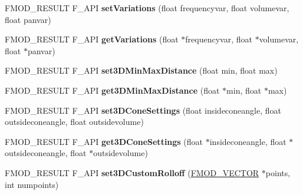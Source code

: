 \begin{DoxyCompactItemize}
\item 
\hypertarget{class_f_m_o_d_1_1_sound_adc2709acd1734f56b55c12dee01cda7b}{F\-M\-O\-D\-\_\-\-R\-E\-S\-U\-L\-T F\-\_\-\-A\-P\-I {\bfseries set\-Variations} (float frequencyvar, float volumevar, float panvar)}\label{class_f_m_o_d_1_1_sound_adc2709acd1734f56b55c12dee01cda7b}

\item 
\hypertarget{class_f_m_o_d_1_1_sound_a62af5aa6618aca4965b91dd01672b2b3}{F\-M\-O\-D\-\_\-\-R\-E\-S\-U\-L\-T F\-\_\-\-A\-P\-I {\bfseries get\-Variations} (float $\ast$frequencyvar, float $\ast$volumevar, float $\ast$panvar)}\label{class_f_m_o_d_1_1_sound_a62af5aa6618aca4965b91dd01672b2b3}

\item 
\hypertarget{class_f_m_o_d_1_1_sound_acc2bb0f37e41ccdacfc27ec28cd2cd26}{F\-M\-O\-D\-\_\-\-R\-E\-S\-U\-L\-T F\-\_\-\-A\-P\-I {\bfseries set3\-D\-Min\-Max\-Distance} (float min, float max)}\label{class_f_m_o_d_1_1_sound_acc2bb0f37e41ccdacfc27ec28cd2cd26}

\item 
\hypertarget{class_f_m_o_d_1_1_sound_aca77cc87d0375dcf9d26be19073dcc45}{F\-M\-O\-D\-\_\-\-R\-E\-S\-U\-L\-T F\-\_\-\-A\-P\-I {\bfseries get3\-D\-Min\-Max\-Distance} (float $\ast$min, float $\ast$max)}\label{class_f_m_o_d_1_1_sound_aca77cc87d0375dcf9d26be19073dcc45}

\item 
\hypertarget{class_f_m_o_d_1_1_sound_a9b239365e93cf9ec141b8239b2770e0a}{F\-M\-O\-D\-\_\-\-R\-E\-S\-U\-L\-T F\-\_\-\-A\-P\-I {\bfseries set3\-D\-Cone\-Settings} (float insideconeangle, float outsideconeangle, float outsidevolume)}\label{class_f_m_o_d_1_1_sound_a9b239365e93cf9ec141b8239b2770e0a}

\item 
\hypertarget{class_f_m_o_d_1_1_sound_a9033acfd185c7e24c706e83effbdb516}{F\-M\-O\-D\-\_\-\-R\-E\-S\-U\-L\-T F\-\_\-\-A\-P\-I {\bfseries get3\-D\-Cone\-Settings} (float $\ast$insideconeangle, float $\ast$outsideconeangle, float $\ast$outsidevolume)}\label{class_f_m_o_d_1_1_sound_a9033acfd185c7e24c706e83effbdb516}

\item 
\hypertarget{class_f_m_o_d_1_1_sound_a277c94985b2caf5aed6125604a6d6f74}{F\-M\-O\-D\-\_\-\-R\-E\-S\-U\-L\-T F\-\_\-\-A\-P\-I {\bfseries set3\-D\-Custom\-Rolloff} (\hyperlink{struct_f_m_o_d___v_e_c_t_o_r}{F\-M\-O\-D\-\_\-\-V\-E\-C\-T\-O\-R} $\ast$points, int numpoints)}\label{class_f_m_o_d_1_1_sound_a277c94985b2caf5aed6125604a6d6f74}


\end{DoxyCompactItemize}
